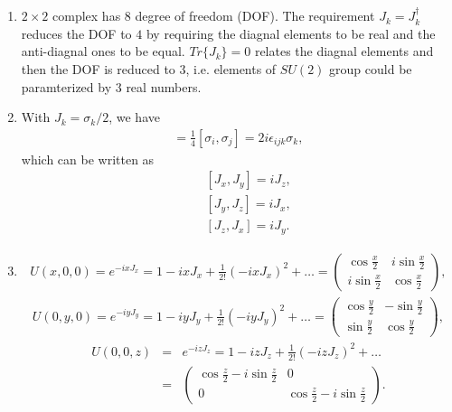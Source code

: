\documentclass[11pt]{article}
\begin{document}
\section{ }
\begin{enumerate}
    \item $2 \times 2$ complex has $8$ degree of freedom (DOF). The requirement $J_k=J_k^\dagger$ reduces the DOF to $4$ by requiring the diagnal elements to be real and the anti-diagnal ones to be equal. $Tr\{ J_k\}=0$ relates the diagnal elements and then the DOF is reduced to $3$, i.e. elements of $SU(2)$ group could be paramterized by $3$ real numbers.
    \item With $J_k = \sigma_k/2$, we have
    \begin{eqnarray}
        [J_i,J_j]=\frac{1}{4} [\sigma_i,\sigma_j]=2i\epsilon_{ijk}\sigma_k,
    \end{eqnarray}
    which can be written as
    \begin{eqnarray}
        &&[ J_x, J_y ] = i J_z, \\
        &&[ J_y, J_z ] = i J_x, \\
        &&[ J_z, J_x ] = i J_y.
    \end{eqnarray}
    \item 
    \begin{eqnarray}
        U(x,0,0)= e^{-ixJ_x}= 1-ixJ_x+\frac{1}{2!} (-ixJ_x)^2+\dots=
        \begin{pmatrix}
            \cos\frac{x}{2}& i\sin\frac{x}{2} \\
            i\sin\frac{x}{2}&\cos\frac{x}{2}
        \end{pmatrix},
    \end{eqnarray}
    \begin{eqnarray}
        U(0,y,0)= e^{-iyJ_y}= 1-iyJ_y+\frac{1}{2!} (-iyJ_y)^2+\dots=
        \begin{pmatrix}
            \cos \frac{y}{2}&  -\sin \frac{y}{2}\\
            \sin \frac{y}{2}&\cos \frac{y}{2}
        \end{pmatrix},
   \end{eqnarray}
   \begin{eqnarray}
    U(0,0,z)&=&e^{-izJ_z}= 1-izJ_z+\frac{1}{2!} (-izJ_z)^2+\dots\\
    &=&
    \begin{pmatrix}
        \cos \frac{z}{2}-i\sin \frac{z}{2}    & 0\\
               0 &\cos\frac{z}{2}-i\sin \frac{z}{2}  
    \end{pmatrix}.
    \end{eqnarray}
\end{enumerate}
\end{document}

